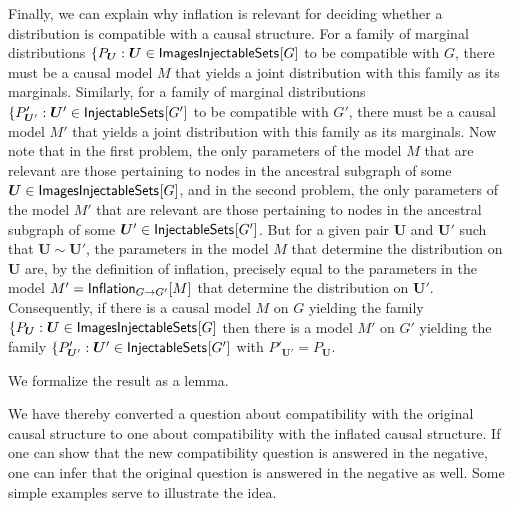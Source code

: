 Finally, we can explain why inflation is relevant for deciding whether a distribution is compatible with a causal structure.  For a family of marginal distributions $\{ P_{\bm{U}} : \bm{U} \in \SmallNamedFunction{ImagesInjectableSets}{G}$ to be compatible with $G$, there must be a causal model $M$ that yields a joint distribution with this family as its marginals.   Similarly, for a family of marginal distributions $\{ P'_{\bm{U}'} : \bm{U}' \in \SmallNamedFunction{InjectableSets}{G'}$ to be compatible with $G'$, there must be a causal model $M'$ that yields a joint distribution with this family as its marginals.  Now note that in the first problem, the only parameters of the model $M$ that are relevant are those pertaining to nodes in the ancestral subgraph of some $\bm{U}\in \SmallNamedFunction{ImagesInjectableSets}{G}$, and in the second problem, the only parameters of the model $M'$ that are relevant are those pertaining to nodes in the ancestral subgraph of some $\bm{U}' \in \SmallNamedFunction{InjectableSets}{G'}$.  But for a given pair $\bm{U}$ and $\bm{U}'$ such that  $\bm{U} \sim \bm{U}'$, the parameters in the model $M$ that determine the distribution on  $\bm{U}$ are, by the definition of inflation, precisely equal to the parameters in the model $M' = \SmallNamedFunction[G\to G']{Inflation}{M}$ that determine the distribution on $\bm{U}'$.  
Consequently, if there is a causal model $M$ on $G$ yielding the family $\{ P_{\bm{U}} : \bm{U} \in \SmallNamedFunction{ImagesInjectableSets}{G}$ then there is a model $M'$ on $G'$ yielding the family $\{ P'_{\bm{U}'} : \bm{U}' \in \SmallNamedFunction{InjectableSets}{G'}$ with $P'_{\bm{U}'}= P_{\bm{U}}$.  

We formalize the result as a lemma. 

We have thereby converted a question about compatibility with the original causal structure to one about compatibility with the inflated causal structure.  If one can show that the new compatibility question is answered in the negative, one can infer that the original question is answered in the negative as well.    Some simple examples serve to illustrate the idea.




